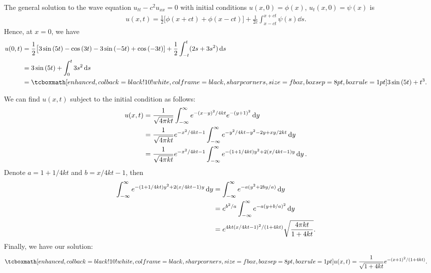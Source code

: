 The general solution to the wave equation $u_{tt} - c^2u_{xx} = 0$ with initial conditions $u(x,0) = \phi(x)$, $u_{t}(x,0) = \psi(x)$ is
\begin{eqnarray}
    \label{eq:gen-sol-wave}
    u(x,t) = \frac{1}{2}\big[ \phi(x + ct) + \phi(x - ct) \big] + \frac{1}{2c} \int_{x-ct}^{x+ct} \psi(s) \dd{s}
.\end{eqnarray}
Hence, at $x = 0$, we have
\begin{align}
    \label{eq:x=0}
    u(0,t) &= \frac{1}{2} \big[ 3\sin{(5t)} - \cos{(3t)} - 3\sin{(-5t)} + \cos{(-3t)}] + \frac{1}{2}\int_{-t}^{t} (2s + 3s^2) \dd{s} \notag \\
           &= 3 \sin{(5t)} + \int_{0}^{t} 3s^2 \dd{s} \notag \\
           &= \eqbox{3\sin{(5t)} + t^3}
.\end{align}



We can find $u(x,t)$ subject to the initial condition as follows:
\begin{align}
    \label{eq:solve-u-diff}
    u(x,t) &= \frac{1}{\sqrt{4 \pi k t}} \int_{-\infty}^{\infty} e^{-(x-y)^2/4kt}e^{-(y+1)^2} \dd{y} \notag \\
           &= \frac{1}{\sqrt{4 \pi k t}} e^{-x^2/4kt - 1} \int_{-\infty}^{\infty} e^{-y^2/4kt - y^2 - 2y + xy/2kt} \dd{y} \notag \\
           &= \frac{1}{\sqrt{4 \pi k t}} e^{-x^2/4kt - 1} \int_{-\infty}^{\infty} e^{-(1 + 1/4kt)y^2 + 2(x/4kt - 1)y} \dd{y}
.\end{align}
Denote $a = 1 + 1/4kt$ and $b = x/4kt - 1$, then
\begin{align}
    \label{eq:u-diff-simplify}
    \int_{-\infty}^{\infty} e^{-(1 + 1/4kt)y^2 + 2(x/4kt - 1)y} \dd{y} &= \int_{-\infty}^{\infty} e^{-a(y^2 + 2by/a)} \dd{y} \notag \\
                                                                       &= e^{b^2/a} \int_{-\infty}^{\infty} e^{-a(y + b/a)^2} \dd{y} \notag \\
                                                                       &= e^{4kt(x/4kt - 1)^2/(1 + 4kt)} \sqrt{\frac{4 \pi k t}{1 + 4kt}}
.\end{align}
Finally, we have our solution:
\begin{eqnarray}
    \label{eq:solution-5}
    \eqbox{
    u(x,t) = \frac{1}{\sqrt{1 + 4kt}} e^{-(x+1)^2/(1 + 4kt)}
}
.\end{eqnarray}




